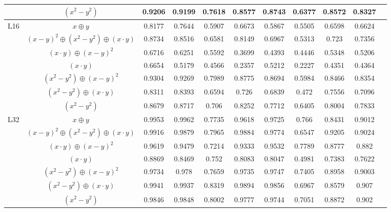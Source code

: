 \documentclass{article}
\begin{document}
\begin{table}[htbp]
\begin{tabular}{lcccccccccc}
& $(x^2-y^2)$  & 0.9206 & 0.9199 & 0.7618 & 0.8577 & 0.8743 & 0.6377 & 0.8572 & 0.8327 \\
\midrule 
\multirow{7}{*}{L16} & $x \oplus y$  & 0.8177 & 0.7644 & 0.5907 & 0.6673 & 0.5867 & 0.5505 & 0.6598 & 0.6624 \\
& $(x-y)^2 \oplus (x^2-y^2) \oplus (x \cdot y)$  & 0.8734 & 0.8516 & 0.6581 & 0.8149 & 0.6967 & 0.5313 & 0.723 & 0.7356 \\
& $(x \cdot y) \oplus (x-y)^2$  & 0.6716 & 0.6251 & 0.5592 & 0.3699 & 0.4393 & 0.4446 & 0.5348 & 0.5206 \\
& $(x \cdot y)$  & 0.6654 & 0.5179 & 0.4566 & 0.2357 & 0.5212 & 0.2227 & 0.4351 & 0.4364 \\
& $(x^2-y^2) \oplus (x-y)^2$  & 0.9304 & 0.9269 & 0.7989 & 0.8775 & 0.8694 & 0.5984 & 0.8466 & 0.8354 \\
& $(x^2-y^2) \oplus (x \cdot y)$  & 0.8311 & 0.8393 & 0.6594 & 0.726 & 0.6839 & 0.472 & 0.7556 & 0.7096 \\
& $(x^2-y^2)$  & 0.8679 & 0.8717 & 0.706 & 0.8252 & 0.7712 & 0.6405 & 0.8004 & 0.7833 \\
\midrule 
\multirow{7}{*}{L32} & $x \oplus y$  & 0.9953 & 0.9962 & 0.7735 & 0.9618 & 0.9725 & 0.766 & 0.8431 & 0.9012 \\
& $(x-y)^2 \oplus (x^2-y^2) \oplus (x \cdot y)$  & 0.9916 & 0.9879 & 0.7965 & 0.9884 & 0.9774 & 0.6547 & 0.9205 & 0.9024 \\
& $(x \cdot y) \oplus (x-y)^2$  & 0.9619 & 0.9479 & 0.7214 & 0.9333 & 0.9532 & 0.7789 & 0.8777 & 0.882 \\
& $(x \cdot y)$  & 0.8869 & 0.8469 & 0.752 & 0.8083 & 0.8047 & 0.4981 & 0.7383 & 0.7622 \\
& $(x^2-y^2) \oplus (x-y)^2$  & 0.9734 & 0.978 & 0.7659 & 0.9735 & 0.9747 & 0.7405 & 0.8958 & 0.9003 \\
& $(x^2-y^2) \oplus (x \cdot y)$  & 0.9941 & 0.9937 & 0.8319 & 0.9894 & 0.9856 & 0.6967 & 0.8579 & 0.907 \\
& $(x^2-y^2)$  & 0.9846 & 0.9848 & 0.8002 & 0.9777 & 0.9744 & 0.7051 & 0.8872 & 0.902 \\
\bottomrule
\end{tabular}
\end{table}
\end{document}
